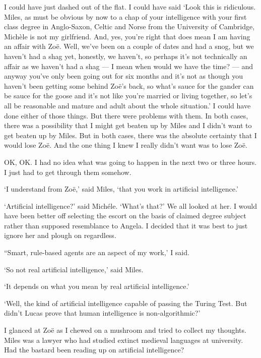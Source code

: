 I could have just dashed out of the flat. I could have said `Look
this is ridiculous. Miles, as must be obvious by now to a chap of
your intelligence with your first class degree in Anglo-Saxon, Celtic and Norse from the University of Cambridge, Mich{\`e}le is not my girlfriend. And, yes,
you're right that does mean I am having an affair with Zo{\"e}.
Well, we've been on a couple of dates and had a snog, but we haven't
had a shag yet, honestly, we haven't, so perhaps it's not
technically an affair as we haven't had a shag --- I mean when would we have the time? --- and anyway you've
only been going out for six months and it's not as though you
haven't been getting some behind Zo{\"e}'s back, so what's sauce for
the gander can be sauce for the goose and it's not like you're
married or living together, so let's all be reasonable and mature
and adult about the whole situation.' I could have done either of
those things. But there were problems with them. In both cases,
there was a possibility that I might get beaten up by Miles and I
didn't want to get beaten up by Miles. But in both cases, there was
the absolute certainty that I would lose Zo{\"e}. And the one thing
I knew I really didn't want was to lose Zo{\"e}.

OK, OK. I had no idea what was going to happen in the next two or
three hours. I just had to get through them somehow.

`I understand from Zo{\"e},' said Miles, `that you work in
artificial intelligence.'

`Artificial intelligence?' said Mich{\'e}le. `What's that?' We all
looked at her. I would have been better off selecting the escort on
the basis of claimed degree subject rather than supposed resemblance
to Angela. I decided that it was best to just ignore her and plough
on regardless.

``Smart, rule-based agents are an aspect of my work,' I said.

`So not {\twelveit real\/} artificial intelligence,' said Miles.

`It depends on what you mean by real artificial intelligence.'

`Well, the kind of artificial intelligence capable of passing the
Turing Test. But didn't Lucas prove that human intelligence is
non-algorithmic?'

I glanced at Zo{\"e} as I chewed on a mushroom and tried to collect
my thoughts. Miles was a lawyer who had studied extinct medieval
languages at university. Had the bastard been reading up on
artificial intelligence?

